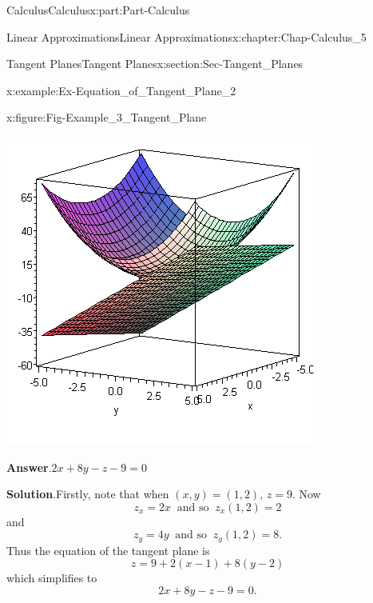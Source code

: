 \documentclass[oneside,10pt,]{book}
\newcommand{\blocktitlefont}{\relax}
\numberwithin{equation}{section}
\begin{document}
\begin{partptx}{Calculus}{}{Calculus}{}{}{x:part:Part-Calculus}
\begin{chapterptx}{Linear Approximations}{}{Linear Approximations}{}{}{x:chapter:Chap-Calculus_5}
\begin{sectionptx}{Tangent Planes}{}{Tangent Planes}{}{}{x:section:Sec-Tangent_Planes}
\begin{example}{}{x:example:Ex-Equation_of_Tangent_Plane_2}
\begin{figureptx}{}{x:figure:Fig-Example_3_Tangent_Plane}{}%
\begin{image}{0.15}{0.7}{0.15}%
\includegraphics[width=\linewidth]{./Calculus/Images/5/Ex3_Tangent_Plane.png}
\end{image}%
\tcblower
\end{figureptx}%
\par\smallskip%
\noindent\textbf{\blocktitlefont Answer}.\hypertarget{g:answer:id548590}{}\quad{}\(2x+8y-z-9=0\)%
\par\smallskip%
\noindent\textbf{\blocktitlefont Solution}.\hypertarget{g:solution:id548584}{}\quad{}Firstly, note that when \((x,y)=(1,2)\), \(z=9\). Now%
\begin{equation*}
z_x = 2x \: \text{ and so } \: z_x(1,2) = 2
\end{equation*}
and%
\begin{equation*}
z_y = 4y \: \text{ and so } \: z_y(1,2) = 8\text{.}
\end{equation*}
Thus the equation of the tangent plane is%
\begin{equation*}
z = 9+2(x-1)+8(y-2)
\end{equation*}
which simplifies to%
\begin{equation*}
2x+8y-z-9=0\text{.}
\end{equation*}
%

\end{example}
\end{sectionptx}
\end{chapterptx}
\end{partptx}
\end{document}
